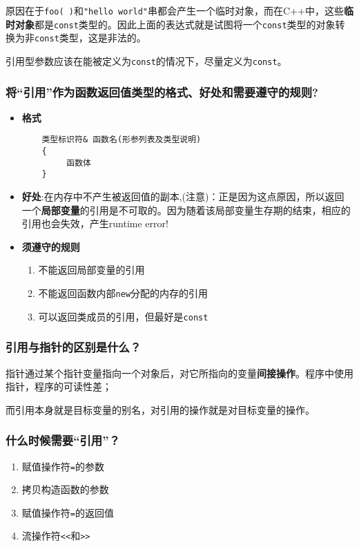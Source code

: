 \documentclass[UTF8,a4paper,8pt]{ctexart}
\begin{document}
			原因在于\verb|foo( )|和\verb|"hello world"|串都会产生一个临时对象，而在C++中，这些\textbf{临时对象}都是\verb|const|类型的。因此上面的表达式就是试图将一个\verb|const|类型的对象转换为非\verb|const|类型，这是非法的。
			
			引用型参数应该在能被定义为\verb|const|的情况下，尽量定义为\verb|const|。
		\subsubsection{将“引用”作为函数返回值类型的格式、好处和需要遵守的规则?}
			\begin{itemize}[itemindent = 1em]
				\item \textbf{格式}
					\begin{lstlisting}
	类型标识符& 函数名(形参列表及类型说明)
	{ 
		 函数体
	}
					\end{lstlisting}
				\item \textbf{好处}:在内存中不产生被返回值的副本,(注意)：正是因为这点原因，所以返回一个\textbf{局部变量}的引用是不可取的。因为随着该局部变量生存期的结束，相应的引用也会失效，产生runtime error!
				
				\item \textbf{须遵守的规则}
					\begin{enumerate}
						\item 不能返回局部变量的引用
						\item 不能返回函数内部\verb|new|分配的内存的引用
						\item 可以返回类成员的引用，但最好是\verb|const|
					\end{enumerate}
			\end{itemize}		
		
		\subsubsection{引用与指针的区别是什么？}
			 指针通过某个指针变量指向一个对象后，对它所指向的变量\textbf{间接操作}。程序中使用指针，程序的可读性差；
			
			而引用本身就是目标变量的别名，对引用的操作就是对目标变量的操作。

		\subsubsection{什么时候需要“引用”？}
			\begin{enumerate}[itemindent = 1em]
				\item 赋值操作符\verb|=|的参数
				\item 拷贝构造函数的参数
				\item 赋值操作符\verb|=|的返回值
				\item 流操作符\verb|<<|和\verb|>>|
			\end{enumerate}
		
\end{document}
